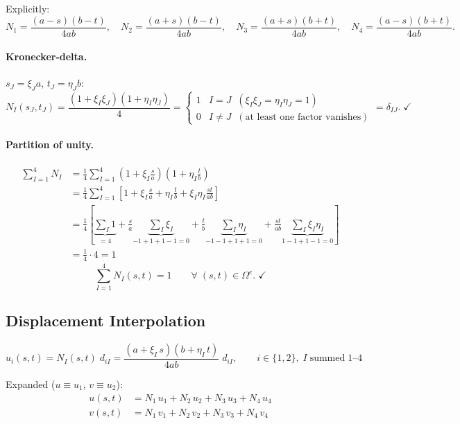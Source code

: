 \documentclass[11pt, a4paper]{article}
\begin{document}
Explicitly:
\begin{equation}\label{eq:NI_explicit}
N_1=\frac{(a-s)(b-t)}{4ab},\quad
N_2=\frac{(a+s)(b-t)}{4ab},\quad
N_3=\frac{(a+s)(b+t)}{4ab},\quad
N_4=\frac{(a-s)(b+t)}{4ab}.
\end{equation}

\paragraph{Kronecker-delta.}
$s_J=\xi_J a$, $t_J=\eta_J b$:
\[
N_I(s_J,t_J)=\frac{(1+\xi_I\xi_J)(1+\eta_I\eta_J)}{4}
=\begin{cases}1 & I=J\;\;(\xi_I\xi_J=\eta_I\eta_J=1)\\0 & I\neq J\;\;(\text{at least one factor vanishes})\end{cases}
=\delta_{IJ}.\;\checkmark
\]

\paragraph{Partition of unity.}
\begin{align*}
\sum_{I=1}^{4}N_I
&= \frac{1}{4}\sum_{I=1}^{4}\!\left(1+\xi_I\frac{s}{a}\right)\!\!\left(1+\eta_I\frac{t}{b}\right) \\[6pt]
&= \frac{1}{4}\sum_{I=1}^{4}\!\left[1+\xi_I\frac{s}{a}+\eta_I\frac{t}{b}+\xi_I\eta_I\frac{st}{ab}\right] \\[6pt]
&= \frac{1}{4}\!\left[\underbrace{\sum_I 1}_{=4}
  +\frac{s}{a}\underbrace{\sum_I\xi_I}_{-1+1+1-1=0}
  +\frac{t}{b}\underbrace{\sum_I\eta_I}_{-1-1+1+1=0}
  +\frac{st}{ab}\underbrace{\sum_I\xi_I\eta_I}_{1-1+1-1=0}\right] \\[6pt]
&= \frac{1}{4}\cdot 4 = 1
\end{align*}
\begin{equation}\label{eq:pou}
\sum_{I=1}^{4}N_I(s,t)=1\qquad\forall\;(s,t)\in\Omega^e.\;\checkmark
\end{equation}

\subsection{Displacement Interpolation}
\begin{equation}\label{eq:disp_interp}
\boxed{u_i(s,t)=N_I(s,t)\;d_{iI}=\frac{(a+\xi_I\,s)(b+\eta_I\,t)}{4ab}\;d_{iI},\qquad i\in\{1,2\},\;I\;\text{summed}\;1\text{--}4}
\end{equation}

Expanded ($u\equiv u_1$, $v\equiv u_2$):
\begin{equation}\label{eq:uv_expanded}
\begin{aligned}
u(s,t) &= N_1\,u_1 + N_2\,u_2 + N_3\,u_3 + N_4\,u_4\\
v(s,t) &= N_1\,v_1 + N_2\,v_2 + N_3\,v_3 + N_4\,v_4
\end{aligned}
\end{equation}
\end{document}
